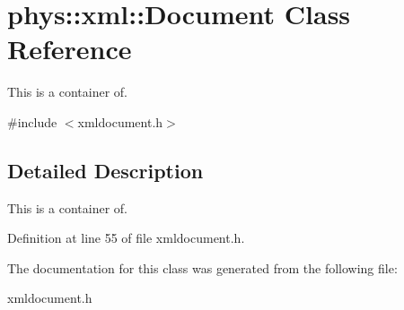 \hypertarget{classphys_1_1xml_1_1Document}{
\section{phys::xml::Document Class Reference}
\label{dd/d44/classphys_1_1xml_1_1Document}
}


This is a container of.  




{\ttfamily \#include $<$xmldocument.h$>$}



\subsection{Detailed Description}
This is a container of. 

Definition at line 55 of file xmldocument.h.



The documentation for this class was generated from the following file:\begin{DoxyCompactItemize}
\item 
xmldocument.h\end{DoxyCompactItemize}
